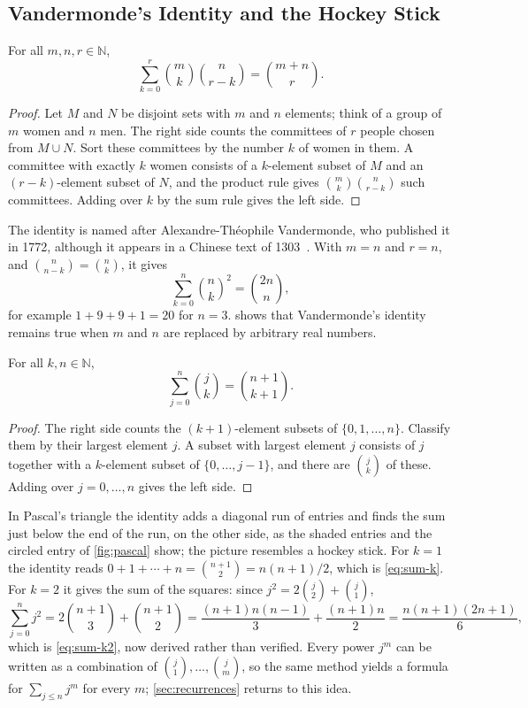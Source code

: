 \subsection{Vandermonde's Identity and the Hockey Stick}

\begin{theorem}
\label{thm:vandermonde}
For all $m,n,r\in\mathbb N$,
\[
\sum_{k=0}^{r}\binom mk\binom n{r-k}=\binom{m+n}{r}.
\]
\end{theorem}

\begin{proof}
Let $M$ and $N$ be disjoint sets with $m$ and $n$ elements; think of a group of $m$ women and $n$ men. The right side counts the committees of $r$ people chosen from $M\cup N$. Sort these committees by the number $k$ of women in them. A committee with exactly $k$ women consists of a $k$-element subset of $M$ and an $(r-k)$-element subset of $N$, and the product rule gives $\binom mk\binom n{r-k}$ such committees. Adding over $k$ by the sum rule gives the left side.
\end{proof}

The identity is named after Alexandre-Th\'eophile Vandermonde, who published it in 1772, although it appears in a Chinese text of 1303~\cite[Sect.~5.1]{graham1994concrete}. With $m=n$ and $r=n$, and $\binom n{n-k}=\binom nk$, it gives
\begin{equation}
\sum_{k=0}^{n}\binom nk^2=\binom{2n}{n},
\label{eq:sum-squares-binom}
\end{equation}
for example $1+9+9+1=20$ for $n=3$.  shows that Vandermonde's identity remains true when $m$ and $n$ are replaced by arbitrary real numbers.

\begin{proposition}
\label{prop:hockey-stick}
For all $k,n\in\mathbb N$,
\[
\sum_{j=0}^{n}\binom jk=\binom{n+1}{k+1}.
\]
\end{proposition}

\begin{proof}
The right side counts the $(k+1)$-element subsets of $\{0,1,\ldots,n\}$. Classify them by their largest element $j$. A subset with largest element $j$ consists of $j$ together with a $k$-element subset of $\{0,\ldots,j-1\}$, and there are $\binom jk$ of these. Adding over $j=0,\ldots,n$ gives the left side.
\end{proof}

In Pascal's triangle the identity adds a diagonal run of entries and finds the sum just below the end of the run, on the other side, as the shaded entries and the circled entry of \cref{fig:pascal} show; the picture resembles a hockey stick. For $k=1$ the identity reads $0+1+\cdots+n=\binom{n+1}2=n(n+1)/2$, which is \eqref{eq:sum-k}. For $k=2$ it gives the sum of the squares: since $j^2=2\binom j2+\binom j1$,
\[
\sum_{j=0}^{n}j^2=2\binom{n+1}{3}+\binom{n+1}{2}=\frac{(n+1)n(n-1)}{3}+\frac{(n+1)n}{2}=\frac{n(n+1)(2n+1)}{6},
\]
which is \eqref{eq:sum-k2}, now derived rather than verified. Every power $j^m$ can be written as a combination of $\binom j1,\ldots,\binom jm$, so the same method yields a formula for $\sum_{j\le n}j^m$ for every $m$; \cref{sec:recurrences} returns to this idea.

